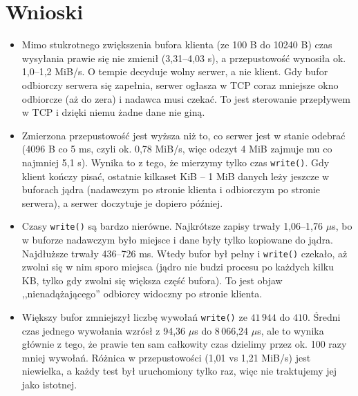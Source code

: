 \documentclass[12pt,a4paper]{article}
\begin{document}
\section*{Wnioski}

\begin{itemize}
    \item Mimo stukrotnego zwiększenia bufora klienta (ze 100 B do 10240 B) czas wysyłania prawie się nie zmienił (3,31--4,03 s), a przepustowość wynosiła ok. 1,0--1,2 MiB/s. O tempie decyduje wolny serwer, a nie klient. Gdy bufor odbiorczy serwera się zapełnia, serwer ogłasza w TCP coraz mniejsze okno odbiorcze (aż do zera) i nadawca musi czekać. To jest sterowanie przepływem w TCP i dzięki niemu żadne dane nie giną.
    \item Zmierzona przepustowość jest wyższa niż to, co serwer jest w stanie odebrać (4096 B co 5 ms, czyli ok. 0,78 MiB/s, więc odczyt 4 MiB zajmuje mu co najmniej 5,1 s). Wynika to z tego, że mierzymy tylko czas \texttt{write()}. Gdy klient kończy pisać, ostatnie kilkaset KiB -- 1 MiB danych leży jeszcze w buforach jądra (nadawczym po stronie klienta i odbiorczym po stronie serwera), a serwer doczytuje je dopiero później.
    \item Czasy \texttt{write()} są bardzo nierówne. Najkrótsze zapisy trwały 1,06--1,76 $\mu$s, bo w buforze nadawczym było miejsce i dane były tylko kopiowane do jądra. Najdłuższe trwały 436--726 ms. Wtedy bufor był pełny i \texttt{write()} czekało, aż zwolni się w nim sporo miejsca (jądro nie budzi procesu po każdych kilku KB, tylko gdy zwolni się większa część bufora). To jest objaw ,,nienadążającego'' odbiorcy widoczny po stronie klienta.
    \item Większy bufor zmniejszył liczbę wywołań \texttt{write()} ze $41\,944$ do $410$. Średni czas jednego wywołania wzrósł z 94,36 $\mu$s do 8\,066,24 $\mu$s, ale to wynika głównie z tego, że prawie ten sam całkowity czas dzielimy przez ok. 100 razy mniej wywołań. Różnica w przepustowości (1,01 vs 1,21 MiB/s) jest niewielka, a każdy test był uruchomiony tylko raz, więc nie traktujemy jej jako istotnej.
\end{itemize}
\end{document}
